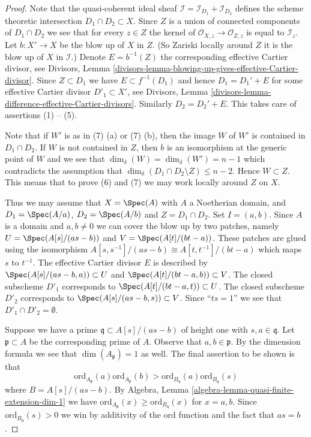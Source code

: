 \begin{proof}
Note that the quasi-coherent ideal sheaf
$\mathcal{I} = \mathcal{I}_{D_1} + \mathcal{I}_{D_2}$
defines the scheme theoretic intersection $D_1 \cap D_2 \subset X$.
Since $Z$ is a union of connected components of $D_1 \cap D_2$
we see that for every $z \in Z$ the kernel of
$\mathcal{O}_{X, z} \to \mathcal{O}_{Z, z}$ is equal to $\mathcal{I}_z$.
Let $b : X' \to X$ be the blow up of $X$ in $Z$. (So Zariski locally
around $Z$ it is the blow up of $X$ in $\mathcal{I}$.)
Denote $E = b^{-1}(Z)$ the corresponding effective Cartier divisor, see
Divisors,
Lemma \ref{divisors-lemma-blowing-up-gives-effective-Cartier-divisor}.
Since $Z \subset D_1$ we have $E \subset f^{-1}(D_1)$ and hence
$D_1 = D_1' + E$ for some effective Cartier divisor $D'_1 \subset X'$,
see Divisors, Lemma \ref{divisors-lemma-difference-effective-Cartier-divisors}.
Similarly $D_2 = D_2' + E$. This takes care of assertions (1) -- (5).

\medskip\noindent
Note that if $W'$ is as in (7) (a) or (7) (b), then the image $W$
of $W'$ is contained in $D_1 \cap D_2$. If $W$ is not contained in
$Z$, then $b$ is an isomorphism at the generic point of $W$ and
we see that $\dim_\delta(W) = \dim_\delta(W') = n - 1$ which
contradicts the assumption that
$\dim_\delta(D_1 \cap D_2 \setminus Z) \leq n - 2$.
Hence $W \subset Z$. This means that
to prove (6) and (7) we may work locally around $Z$ on $X$.

\medskip\noindent
Thus we may assume that $X = \Spec(A)$ with
$A$ a Noetherian domain, and $D_1 = \Spec(A/a)$,
$D_2 = \Spec(A/b)$ and $Z = D_1 \cap D_2$.
Set $I = (a, b)$. Since $A$ is a domain and $a, b \not = 0$ we can
cover the blow up by two patches, namely
$U = \Spec(A[s]/(as - b))$ and $V = \Spec(A[t]/(bt -a))$.
These patches are glued using the isomorphism
$A[s, s^{-1}]/(as - b) \cong A[t, t^{-1}]/(bt - a)$
which maps $s$ to $t^{-1}$.
The effective Cartier divisor $E$ is described by
$\Spec(A[s]/(as - b, a)) \subset U$ and
$\Spec(A[t]/(bt - a, b)) \subset V$.
The closed subscheme $D'_1$ corresponds to
$\Spec(A[t]/(bt - a, t)) \subset U$.
The closed subscheme $D'_2$ corresponds to
$\Spec(A[s]/(as -b, s)) \subset V$.
Since ``$ts = 1$'' we see that $D'_1 \cap D'_2 = \emptyset$.

\medskip\noindent
Suppose we have a prime $\mathfrak q \subset A[s]/(as - b)$
of height one with $s, a \in \mathfrak q$.
Let $\mathfrak p \subset A$ be the corresponding prime of $A$.
Observe that $a, b \in \mathfrak p$.
By the dimension formula we see that $\dim(A_{\mathfrak p}) = 1$
as well. The final assertion to be shown is that
$$
\text{ord}_{A_{\mathfrak p}}(a)
\text{ord}_{A_{\mathfrak p}}(b)
>
\text{ord}_{B_{\mathfrak q}}(a)
\text{ord}_{B_{\mathfrak q}}(s)
$$
where $B = A[s]/(as - b)$. By
Algebra, Lemma \ref{algebra-lemma-quasi-finite-extension-dim-1}
we have $\text{ord}_{A_{\mathfrak p}}(x) \geq \text{ord}_{B_{\mathfrak q}}(x)$
for $x = a, b$. Since $\text{ord}_{B_{\mathfrak q}}(s) > 0$ we win
by additivity of the $\text{ord}$ function and the fact that
$as = b$.
\end{proof}

